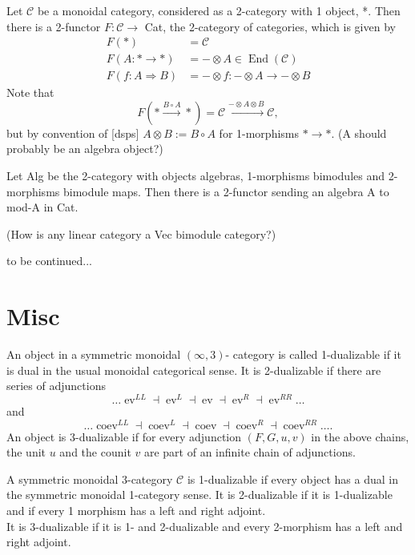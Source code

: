 \documentclass[12pt,a4paper,draft]{article}
\theoremstyle{remark}
\theoremstyle{definition}
\numberwithin{equation}{section}
\newcommand\End{\operatorname{End}}
\newcommand\ev{\operatorname{ev}}
\newcommand\coev{\operatorname{coev}}
\newcommand \C{\mathcal C}
\begin{document}
Let $\C$ be a monoidal category, considered as a 2-category with 1 object, *. Then there is a 2-functor $F:\C \rightarrow$ Cat, the 2-category of categories, which is given by
\begin{align}
	F(*) &= \C\\
	F(A:*\rightarrow *) &= - \otimes A \in \End(\C)\\
	F(f: A\Rightarrow B) &= -\otimes f :-\otimes A \rightarrow -\otimes B  
\end{align}
Note that  
\begin{equation}
 	 F(*\xrightarrow{B\circ A}*) = \C\xrightarrow{-\otimes A\otimes B}\C,
 \end{equation} 
 but by convention of [dsps] $A\otimes B := B\circ A$ for 1-morphisms $*\rightarrow *$.
(A should probably be an algebra object?)

Let Alg be the 2-category with objects algebras, 1-morphisms bimodules and 2-morphisms bimodule maps. Then there is a 2-functor sending an algebra A to mod-A in Cat.

(How is any linear category a Vec bimodule category?)

to be continued...

\section{Misc}

An object in a symmetric monoidal $(\infty, 3)$- category is called 1-dualizable if it is dual in the usual monoidal categorical sense. It is 2-dualizable if there are series of adjunctions 
\begin{equation}
 	\dots\ev^{LL} \dashv \ev^L \dashv \ev \dashv \ev^R \dashv \ev^{RR}\dots 
 \end{equation} 
 and 
 \begin{equation}
 		\dots\coev^{LL} \dashv \coev^L \dashv \coev \dashv \coev^R \dashv \coev^{RR}\dots. 
 \end{equation}
An object is 3-dualizable if for every adjunction $(F, G, u, v)$ in the above chains, the unit $u$ and the counit $v$ are part of an infinite chain of adjunctions.

A symmetric monoidal 3-category $\C$ is 1-dualizable if every object has a dual in the symmetric monoidal 1-category sense. It is 2-dualizable if it is 1-dualizable and if every 1 morphism has a left and right adjoint.\\
It is 3-dualizable if it is 1- and 2-dualizable and every 2-morphism has a left and right adjoint.
\end{document}
